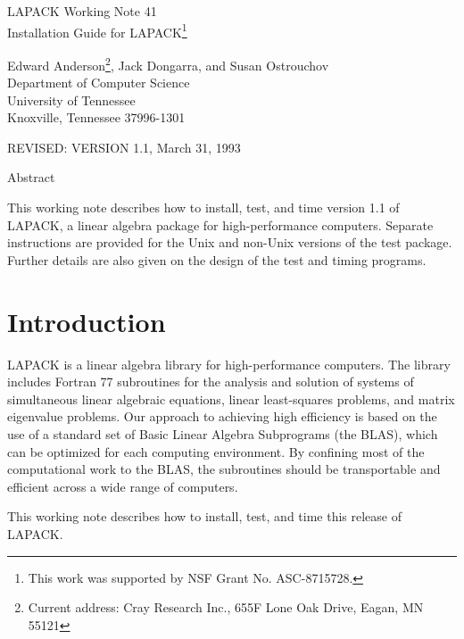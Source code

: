\begin{center}
  {\Large LAPACK Working Note 41\\
  Installation Guide for LAPACK\footnote{This work was supported
  by NSF Grant No. ASC-8715728.}}
\end{center}
\begin{center}
  Edward Anderson\footnote{Current address:  Cray Research Inc.,
                           655F Lone Oak Drive, Eagan, MN  55121},
  Jack Dongarra, and Susan Ostrouchov\\
  Department of Computer Science \\
  University of Tennessee \\
  Knoxville, Tennessee  37996-1301 \\
\end{center}
\begin{center}
  REVISED:  VERSION 1.1, March 31, 1993
\end{center}

\begin{center}
Abstract
\end{center}
This working note describes how to install, test, and time version 1.1
of LAPACK, a linear algebra package for high-performance
computers.  Separate instructions are provided for the Unix and non-Unix
versions of the test package.
Further details are also given on the design of the test and timing
programs. 
\newpage

\tableofcontents

\newpage

\section{Introduction}

\dent
LAPACK is a linear algebra library for high-performance
computers.
The library includes Fortran 77 subroutines for 
the analysis and solution of systems of simultaneous linear algebraic
equations, linear least-squares problems, and matrix eigenvalue
problems.
Our approach to achieving high efficiency is based on the use of
a standard set of Basic Linear Algebra Subprograms (the BLAS),
which can be optimized for each computing environment.
By confining most of the computational work to the BLAS,
the subroutines should be 
transportable and efficient across a wide range of computers.

This working note describes how to install, test, and time this
release of LAPACK.

